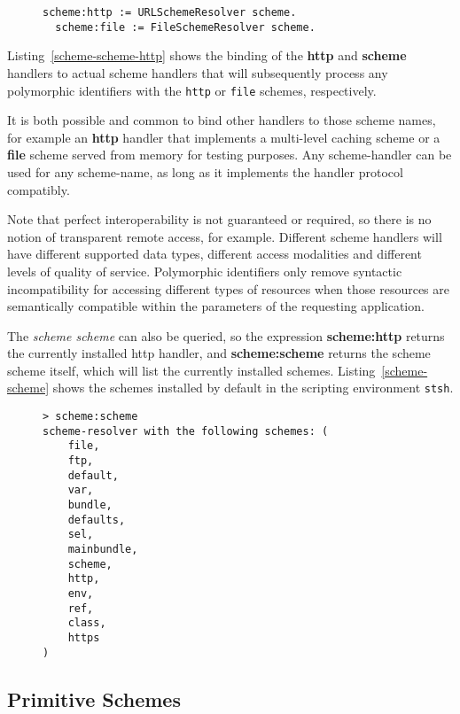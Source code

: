 \documentclass[preprint,authoryear]{acm_proc_article-sp}
\begin{document}
\begin{figure}[htbp]
\begin{lstlisting}[style=L,label=scheme-scheme-http,caption=Adding the http and file schemes.]
  scheme:http := URLSchemeResolver scheme.
  scheme:file := FileSchemeResolver scheme.
\end{lstlisting}
\end{figure}

Listing~\ref{scheme-scheme-http} shows the binding of the {\bf http} and {\bf scheme}
handlers to actual scheme handlers that will subsequently process any polymorphic
identifiers with the {\tt http} or {\tt file} schemes, respectively. 

It is both possible and common to bind other handlers to those scheme
names, for example an {\bf http} handler that implements a multi-level caching scheme
or a {\bf file} scheme served from memory for testing purposes.  Any scheme-handler
can be used for any scheme-name, as long as it implements the handler protocol
compatibly.

Note that perfect interoperability is not guaranteed or required, so there is no notion
of transparent remote access, for example.  Different scheme handlers will have different supported
data types, different access modalities and different levels of quality of service.
Polymorphic identifiers only remove syntactic incompatibility for accessing different types
of resources when those resources are semantically compatible within the parameters
of the requesting application.


The {\em scheme scheme} can also be queried,
so the expression {\bf scheme:http} returns the currently installed http handler, and 
{\bf scheme:scheme} returns the scheme scheme itself, which will list the currently
installed schemes.  Listing~\ref{scheme-scheme} shows the schemes installed by
default in the scripting environment {\tt stsh}.

\begin{figure}[htbp]
\begin{lstlisting}[style=L,label=scheme-scheme,caption=List of schemes via scheme:scheme.]
> scheme:scheme 
scheme-resolver with the following schemes: (
    file,
    ftp,
    default,
    var,
    bundle,
    defaults,
    sel,
    mainbundle,
    scheme,
    http,
    env,
    ref,
    class,
    https
)
\end{lstlisting}
\end{figure}

\subsection{Primitive Schemes}
\label{primitiveSchemes}
\end{document}
